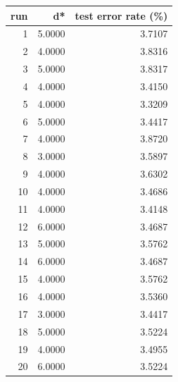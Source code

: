 \begin{tabular}{rrr}
\toprule
run & d* & test error rate (\%) \\
\midrule
1 & 5.0000 & 3.7107 \\
2 & 4.0000 & 3.8316 \\
3 & 5.0000 & 3.8317 \\
4 & 4.0000 & 3.4150 \\
5 & 4.0000 & 3.3209 \\
6 & 5.0000 & 3.4417 \\
7 & 4.0000 & 3.8720 \\
8 & 3.0000 & 3.5897 \\
9 & 4.0000 & 3.6302 \\
10 & 4.0000 & 3.4686 \\
11 & 4.0000 & 3.4148 \\
12 & 6.0000 & 3.4687 \\
13 & 5.0000 & 3.5762 \\
14 & 6.0000 & 3.4687 \\
15 & 4.0000 & 3.5762 \\
16 & 4.0000 & 3.5360 \\
17 & 3.0000 & 3.4417 \\
18 & 5.0000 & 3.5224 \\
19 & 4.0000 & 3.4955 \\
20 & 6.0000 & 3.5224 \\
\bottomrule
\end{tabular}
